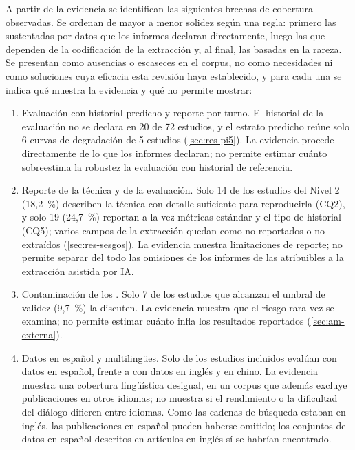 A partir de la evidencia se identifican las siguientes brechas de cobertura observadas. Se ordenan de mayor a menor solidez según una regla: primero las sustentadas por datos que los informes declaran directamente, luego las que dependen de la codificación de la extracción y, al final, las basadas en la rareza. Se presentan como ausencias o escaseces en el corpus, no como necesidades ni como soluciones cuya eficacia esta revisión haya establecido, y para cada una se indica qué muestra la evidencia y qué no permite mostrar:
\begin{enumerate}
  \item Evaluación con historial predicho y reporte por turno. El historial de la evaluación no se declara en 20 de 72 estudios, y el estrato predicho reúne solo 6 curvas de degradación de 5 estudios (\cref{sec:res-pi5}). La evidencia procede directamente de lo que los informes declaran; no permite estimar cuánto sobreestima la robustez la evaluación con historial de referencia.
  \item Reporte de la técnica y de la evaluación. Solo 14 de los estudios del Nivel 2 (18,2~\%) describen la técnica con detalle suficiente para reproducirla (CQ2), y solo 19 (24,7~\%) reportan a la vez métricas estándar y el tipo de historial (CQ5); varios campos de la extracción quedan como no reportados o no extraídos (\cref{sec:res-sesgos}). La evidencia muestra limitaciones de reporte; no permite separar del todo las omisiones de los informes de las atribuibles a la extracción asistida por IA.
  \item Contaminación de los . Solo 7 de los estudios que alcanzan el umbral de validez (9,7~\%) la discuten. La evidencia muestra que el riesgo rara vez se examina; no permite estimar cuánto infla los resultados reportados (\cref{sec:am-externa}).
  \item Datos en español y multilingües. Solo \nDatasetES{} de los \nEstudios{} estudios incluidos evalúan con datos en español, frente a \nDatasetEN{} con datos en inglés y \nDatasetZH{} en chino. La evidencia muestra una cobertura lingüística desigual, en un corpus que además excluye publicaciones en otros idiomas; no muestra si el rendimiento o la dificultad del diálogo difieren entre idiomas. Como las cadenas de búsqueda estaban en inglés, las publicaciones en español pueden haberse omitido; los conjuntos de datos en español descritos en artículos en inglés sí se habrían encontrado.

\end{enumerate}
